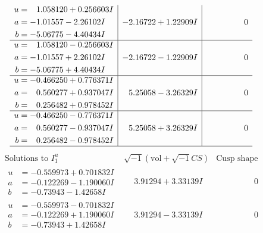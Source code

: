 \documentclass[1p]{elsarticle_modified}
\theoremstyle{definition}
\newcommand{\I}{\sqrt{-1}}
\begin{document}
$$\begin{array}{c|c|c}
\begin{aligned}
u &= \phantom{-}1.058120 + 0.256603 I \\
a &= -1.01557 - 2.26102 I \\
b &= -5.06775 - 4.40434 I\end{aligned}
 & -2.16722 + 1.22909 I & \phantom{-0.000000 } 0 \\ \hline\begin{aligned}
u &= \phantom{-}1.058120 - 0.256603 I \\
a &= -1.01557 + 2.26102 I \\
b &= -5.06775 + 4.40434 I\end{aligned}
 & -2.16722 - 1.22909 I & \phantom{-0.000000 } 0 \\ \hline\begin{aligned}
u &= -0.466250 + 0.776371 I \\
a &= \phantom{-}0.560277 + 0.937047 I \\
b &= \phantom{-}0.256482 + 0.978452 I\end{aligned}
 & \phantom{-}5.25058 - 3.26329 I & \phantom{-0.000000 } 0 \\ \hline\begin{aligned}
u &= -0.466250 - 0.776371 I \\
a &= \phantom{-}0.560277 - 0.937047 I \\
b &= \phantom{-}0.256482 - 0.978452 I\end{aligned}
 & \phantom{-}5.25058 + 3.26329 I & \phantom{-0.000000 } 0\\
 \hline 
 \end{array}$$\newpage$$\begin{array}{c|c|c}  
\text{Solutions to }I^u_{1}& \I (\text{vol} + \sqrt{-1}CS) & \text{Cusp shape}\\
 \hline 
\begin{aligned}
u &= -0.559973 + 0.701832 I \\
a &= -0.122269 - 1.190060 I \\
b &= -0.73943 - 1.42658 I\end{aligned}
 & \phantom{-}3.91294 + 3.33139 I & \phantom{-0.000000 } 0 \\ \hline\begin{aligned}
u &= -0.559973 - 0.701832 I \\
a &= -0.122269 + 1.190060 I \\
b &= -0.73943 + 1.42658 I\end{aligned}
 & \phantom{-}3.91294 - 3.33139 I & \phantom{-0.000000 } 0 \\ \hline\begin{aligned}

\end{aligned}
\end{array}$$
\end{document}
